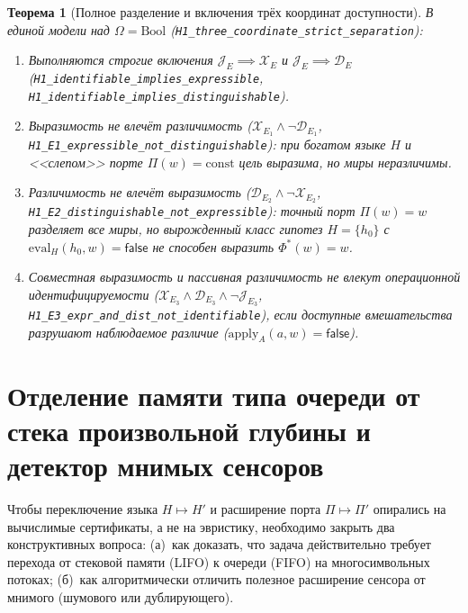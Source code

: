 \documentclass[11pt,a4paper]{article}
\theoremstyle{cleanthm}
\newtheorem{theorem}{Теорема}[section]
\theoremstyle{cleandef}
\begin{document}
\begin{theorem}[Полное разделение и включения трёх координат доступности]
\label{thm:h1_separation}
В единой модели над $\Omega=\mathrm{Bool}$ (\texttt{H1\_three\_\allowbreak coordinate\_\allowbreak strict\_\allowbreak separation}):
\begin{enumerate}
  \item Выполняются строгие включения $\mathcal{J}_E \implies \mathcal{X}_E$ и $\mathcal{J}_E \implies \mathcal{D}_E$ (\texttt{H1\_identifiable\_\allowbreak implies\_\allowbreak expressible}, \texttt{H1\_identifiable\_\allowbreak implies\_\allowbreak distinguishable}).
  \item Выразимость не влечёт различимость ($\mathcal{X}_{E_1} \land \neg\mathcal{D}_{E_1}$, \texttt{H1\_E1\_expressible\_\allowbreak not\_\allowbreak distinguishable}): при богатом языке $H$ и <<слепом>> порте $\Pi(w)=\mathrm{const}$ цель выразима, но миры неразличимы.
  \item Различимость не влечёт выразимость ($\mathcal{D}_{E_2} \land \neg\mathcal{X}_{E_2}$, \texttt{H1\_E2\_distinguishable\_\allowbreak not\_\allowbreak expressible}): точный порт $\Pi(w)=w$ разделяет все миры, но вырожденный класс гипотез $H=\{h_0\}$ с $\mathrm{eval}_H(h_0,w)=\mathsf{false}$ не способен выразить $\Phi^*(w)=w$.
  \item Совместная выразимость и пассивная различимость не влекут операционной идентифицируемости ($\mathcal{X}_{E_3} \land \mathcal{D}_{E_3} \land \neg\mathcal{J}_{E_3}$, \texttt{H1\_E3\_expr\_\allowbreak and\_\allowbreak dist\_\allowbreak not\_\allowbreak identifiable}), если доступные вмешательства разрушают наблюдаемое различие ($\mathrm{apply}_A(a,w)=\mathsf{false}$).
\end{enumerate}
\end{theorem}

\section{Отделение памяти типа очереди от стека произвольной глубины и детектор мнимых сенсоров}

Чтобы переключение языка $H\mapsto H'$ и расширение порта $\Pi\mapsto\Pi'$ опирались на вычислимые сертификаты, а не на эвристику, необходимо закрыть два конструктивных вопроса: (а)~как доказать, что задача действительно требует перехода от стековой памяти (LIFO) к очереди (FIFO) на многосимвольных потоках; (б)~как алгоритмически отличить полезное расширение сенсора от мнимого (шумового или дублирующего).
\end{document}
